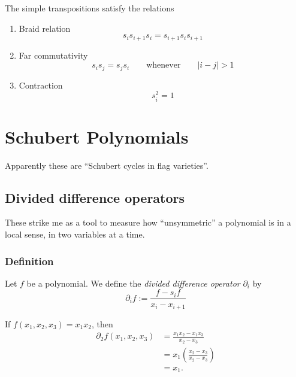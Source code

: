 \documentclass{article}
\begin{document}
\begin{theorem}\label{thm:simplerelations}
    The simple transpositions satisfy the relations
    \begin{enumerate}[label=(\alph*)]
        \item Braid relation 
            \begin{equation}\label{eq:simplebraid}
                s_is_{i+1}s_i = s_{i+1}s_is_{i+1}
            \end{equation}
        \item Far commutativity
            \begin{equation}\label{eq:simplecommute}
                s_is_j = s_js_i\qquad \text{whenever}\qquad|i-j| > 1
            \end{equation}
        \item Contraction
            \begin{equation}\label{eq:simplecontract}
                s_i^2 = 1
            \end{equation}
    \end{enumerate}
\end{theorem}

\section{Schubert Polynomials}

Apparently these are ``Schubert cycles in flag varieties''.

\subsection{Divided difference operators}

These strike me as a tool to measure how ``unsymmetric'' a polynomial is in a local sense, in two variables at a time. 

\subsubsection{Definition}

\begin{definition}
    Let $f$ be a polynomial. 
    We define the \textit{divided difference operator} $\partial_i$ by 
    \begin{equation}
        \partial_i f := \frac{f-s_if}{x_i-x_{i+1}}
    \end{equation}
\end{definition}

\begin{example}
    If $f(x_1, x_2, x_3) = x_1x_2$, then
    \begin{align*}
        \partial_2 f(x_1,x_2,x_3) &= \frac{x_1x_2 - x_1x_3}{x_2 - x_3} \\
                                  &= x_1\left(\frac{x_2-x_3}{x_2-x_3}\right) \\
                                  &= x_1.
    \end{align*}
\end{example}
\end{document}
